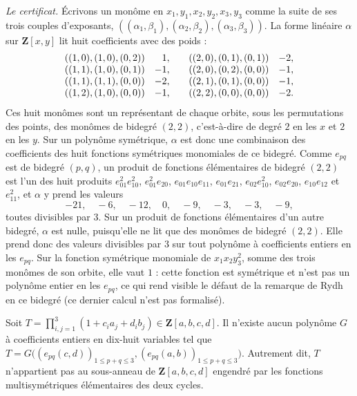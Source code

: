\emph{Le certificat.} Écrivons un monôme en $x_1, y_1, x_2, y_2, x_3, y_3$ comme la suite de ses trois couples d'exposants, $((\alpha_1, \beta_1), (\alpha_2, \beta_2), (\alpha_3, \beta_3))$. La forme linéaire $\alpha$ sur $\mathbf Z[x, y]$ lit huit coefficients avec des poids :
\[
\begin{array}{lr@{\qquad}lr}
((1,0),(1,0),(0,2)) & 1, & ((2,0),(0,1),(0,1)) & -2,\\
((1,1),(1,0),(0,1)) & -1, & ((2,0),(0,2),(0,0)) & -1,\\
((1,1),(1,1),(0,0)) & -2, & ((2,1),(0,1),(0,0)) & -1,\\
((1,2),(1,0),(0,0)) & -1, & ((2,2),(0,0),(0,0)) & -2.
\end{array}
\]
Ces huit monômes sont un représentant de chaque orbite, sous les permutations des points, des monômes de bidegré $(2,2)$, c'est-à-dire de degré $2$ en les $x$ et $2$ en les $y$. Sur un polynôme symétrique, $\alpha$ est donc une combinaison des coefficients des huit fonctions symétriques monomiales de ce bidegré. Comme $e_{pq}$ est de bidegré $(p, q)$, un produit de fonctions élémentaires de bidegré $(2,2)$ est l'un des huit produits $e_{01}^2 e_{10}^2$, $e_{01}^2 e_{20}$, $e_{01}e_{10}e_{11}$, $e_{01}e_{21}$, $e_{02}e_{10}^2$, $e_{02}e_{20}$, $e_{10}e_{12}$ et $e_{11}^2$, et $\alpha$ y prend les valeurs
\[
-21,\quad -6,\quad -12,\quad 0,\quad -9,\quad -3,\quad -3,\quad -9,
\]
toutes divisibles par $3$. Sur un produit de fonctions élémentaires d'un autre bidegré, $\alpha$ est nulle, puisqu'elle ne lit que des monômes de bidegré $(2,2)$. Elle prend donc des valeurs divisibles par $3$ sur tout polynôme à coefficients entiers en les $e_{pq}$. Sur la fonction symétrique monomiale de $x_1x_2y_3^2$, somme des trois monômes de son orbite, elle vaut $1$ : cette fonction est symétrique et n'est pas un polynôme entier en les $e_{pq}$, ce qui rend visible le défaut de la remarque de Rydh en ce bidegré (ce dernier calcul n'est pas formalisé).

\begin{encadre}
\begin{contrexemple}
Soit $T = \prod_{i,j=1}^3 (1 + c_i a_j + d_i b_j) \in \mathbf Z[a, b, c, d]$. Il n'existe aucun polynôme $G$ à coefficients entiers en dix-huit variables tel que $T = G\bigl((e_{pq}(c, d))_{1 \leq p+q \leq 3}, (e_{pq}(a, b))_{1 \leq p+q \leq 3}\bigr)$. Autrement dit, $T$ n'appartient pas au sous-anneau de $\mathbf Z[a,b,c,d]$ engendré par les fonctions multisymétriques élémentaires des deux cycles.
\end{contrexemple}
\end{encadre}

